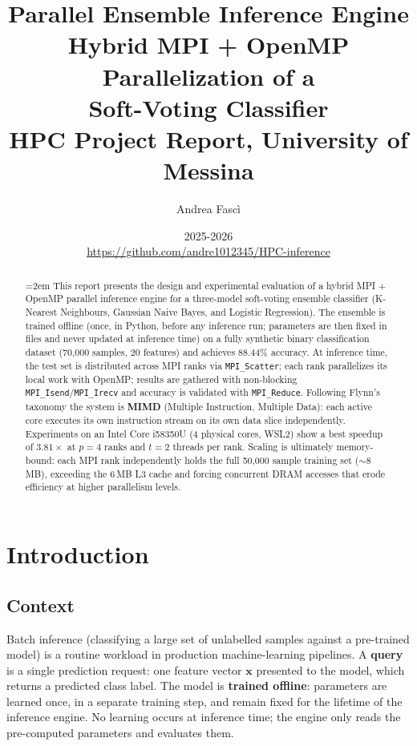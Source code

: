 \documentclass[12pt,a4paper]{article}
\title{
  \textbf{Parallel Ensemble Inference Engine}\\[4pt]
  \large Hybrid MPI + OpenMP Parallelization of a\\ Soft-Voting Classifier\\[8pt]
  \normalsize HPC Project Report,  University of Messina
}
\author{Andrea Fascì}
\date{2025-2026\\[4pt]
\small\url{https://github.com/andre1012345/HPC-inference}}
\begin{document}
\maketitle

\begin{abstract}
\emergencystretch=2em
This report presents the design and experimental evaluation of a hybrid
MPI + OpenMP parallel inference engine for a three-model soft-voting
ensemble classifier (K-Nearest Neighbours, Gaussian Naive Bayes, and
Logistic Regression). The ensemble is trained offline (once, in Python, before any inference run;
parameters are then fixed in files and never updated at inference time) on a
fully synthetic binary classification dataset (70{,}000 samples, 20 features)
and achieves 88.44\% accuracy.
At inference time, the test set is distributed across MPI
ranks via \texttt{MPI\_Scatter}; each rank parallelizes its local work with
OpenMP; results are gathered with non-blocking \texttt{MPI\_Isend}/\allowbreak\texttt{MPI\_Irecv}
and accuracy is validated with \texttt{MPI\_Reduce}.
Following Flynn's taxonomy the system is \textbf{MIMD} (Multiple Instruction,
Multiple Data): each active core executes its own instruction stream on its
own data slice independently.
Experiments on an Intel
Core i5\-8350U (4 physical cores, WSL2) show a best speedup of $3.81\times$
at $p=4$ ranks and $t=2$ threads per rank. Scaling is ultimately memory-bound:
each MPI rank independently holds the full 50{,}000 sample training set
($\sim$8\,MB), exceeding the 6\,MB L3 cache and forcing concurrent DRAM
accesses that erode efficiency at higher parallelism levels.
\end{abstract}

\tableofcontents
\newpage

\section{Introduction}

\subsection{Context}

Batch inference (classifying a large set of unlabelled samples against a
pre-trained model) is a routine workload in production machine-learning
pipelines. A \textbf{query} is a single prediction request: one feature vector
$\mathbf{x}$ presented to the model, which returns a predicted class label.
The model is \textbf{trained offline}: parameters are learned once, in a
separate training step, and remain fixed for the lifetime of the inference
engine. No learning occurs at inference time; the engine only reads the
pre-computed parameters and evaluates them.
\end{document}
